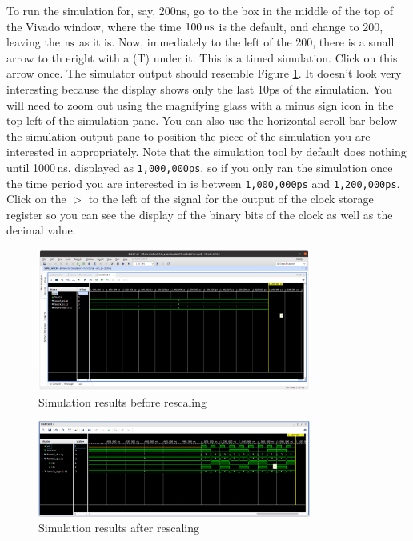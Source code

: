 \documentclass[../physical_computing.tex]{subfiles}
\begin{document}
To run the simulation for, say, 200ns, go to the box in the middle of the top of the Vivado window, where the time $\rm 100\,ns$ is the default, and change to 200, leaving the $\rm ns$ as it is. Now, immediately to the left of the 200, there is a small arrow to th eright with a (T) under it. This is a timed simulation. Click on this arrow once. The simulator output should resemble Figure \ref{fig:vivdac3}. It doesn't look very interesting because the display shows only the last 10ps of the simulation. You will need to zoom out using the magnifying glass with a minus sign icon in the top left of the simulation pane. You can also use the horizontal scroll bar below the simulation output pane to position the piece of the simulation you are interested in appropriately. Note that the simulation tool by default does nothing until 1000\,ns, displayed as \texttt{1,000,000\;ps}, so if you only ran the simulation once the time period you are interested in is between \texttt{1,000,000\;ps} and \texttt{1,200,000\;ps}. Click on the $>$ to the left of the signal for the output of the clock storage register so you can see the display of the binary bits of the clock as well as the decimal value.

\begin{figure}[htbp]
    \centering
    \includegraphics[width=0.8\textwidth]{appendix_7/figures/vivdac3.png}
    \caption{Simulation results before rescaling}
    \label{fig:vivdac3}
\end{figure}
\begin{figure}[htbp]
    \centering
    \includegraphics[width=0.8\textwidth]{appendix_7/figures/vivdac4.png}
    \caption{Simulation results after rescaling}
    \label{fig:vivdac4}
\end{figure}
\end{document}
